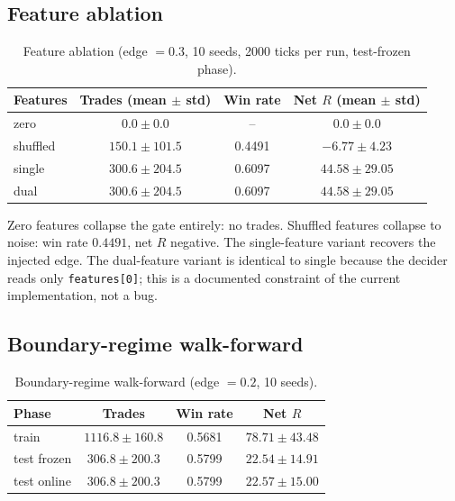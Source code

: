 \documentclass[11pt,a4paper]{article}
\newcommand{\gld}[1]{\textcolor{goldshiny}{#1}}
\newcommand{\cel}[1]{\textcolor{celadon}{#1}}
\theoremstyle{definition}
\begin{document}
\subsection{Feature ablation}

\begin{table}[ht]
\centering
\caption{Feature ablation (edge $=0.3$, 10 seeds, 2000 ticks per run, test-frozen phase).}
\label{tab:ablation}
\renewcommand{\arraystretch}{1.15}
\begin{tabular}{lccc}
\toprule
\gld{Features} & \gld{Trades (mean $\pm$ std)} & \gld{Win rate} & \gld{Net $R$ (mean $\pm$ std)} \\
\midrule
zero       & $0.0 \pm 0.0$        & --      & $0.0 \pm 0.0$ \\
shuffled   & $150.1 \pm 101.5$    & 0.4491   & $-6.77 \pm 4.23$ \\
single     & $300.6 \pm 204.5$    & \cel{0.6097}   & \cel{$44.58 \pm 29.05$} \\
dual       & $300.6 \pm 204.5$    & \cel{0.6097}   & \cel{$44.58 \pm 29.05$} \\
\bottomrule
\end{tabular}
\end{table}

Zero features collapse the gate entirely: no trades. Shuffled features collapse to noise: win rate $0.4491$, net $R$ negative. The single-feature variant recovers the injected edge. The dual-feature variant is identical to single because the decider reads only \texttt{features[0]}; this is a documented constraint of the current implementation, not a bug.

\subsection{Boundary-regime walk-forward}

\begin{table}[ht]
\centering
\caption{Boundary-regime walk-forward (edge $=0.2$, 10 seeds).}
\label{tab:boundary}
\renewcommand{\arraystretch}{1.15}
\begin{tabular}{lccc}
\toprule
\gld{Phase} & \gld{Trades} & \gld{Win rate} & \gld{Net $R$} \\
\midrule
train          & $1116.8 \pm 160.8$ & 0.5681 & $78.71 \pm 43.48$ \\
test frozen    & $306.8 \pm 200.3$  & 0.5799 & $22.54 \pm 14.91$ \\
test online    & $306.8 \pm 200.3$  & 0.5799 & $22.57 \pm 15.00$ \\
\bottomrule
\end{tabular}
\end{table}
\end{document}
